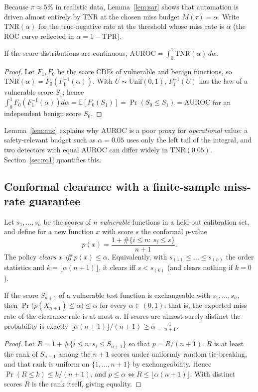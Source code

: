 Because $\pi\approx 5\%$ in realistic data, Lemma~\ref{lem:sar} shows that automation is driven almost entirely by $\mathrm{TNR}$ at the chosen miss budget $M(\tau)=\alpha$.
Write $\mathrm{TNR}(\alpha)$ for the true-negative rate at the threshold whose miss rate is $\alpha$ (the ROC curve reflected in $\alpha=1-\mathrm{TPR}$).

\begin{lemma}\label{lem:auc}
If the score distributions are continuous, $\mathrm{AUROC}=\int_0^1 \mathrm{TNR}(\alpha)\,d\alpha$.
\end{lemma}
\begin{proof}
Let $F_1,F_0$ be the score CDFs of vulnerable and benign functions, so $\mathrm{TNR}(\alpha)=F_0(F_1^{-1}(\alpha))$.
With $U\sim\mathrm{Unif}(0,1)$, $F_1^{-1}(U)$ has the law of a vulnerable score $S_1$; hence $\int_0^1F_0(F_1^{-1}(\alpha))d\alpha=\mathbb E[F_0(S_1)]=\Pr(S_0\le S_1)=\mathrm{AUROC}$ for an independent benign score $S_0$.
\end{proof}

Lemma~\ref{lem:auc} explains why AUROC is a poor proxy for \emph{operational} value: a safety-relevant budget such as $\alpha=0.05$ uses only the left tail of the integral, and two detectors with equal AUROC can differ widely in $\mathrm{TNR}(0.05)$.
Section~\ref{sec:rq1} quantifies this.

\subsection{Conformal clearance with a finite-sample miss-rate guarantee}
Let $s_1,\dots,s_n$ be the scores of $n$ \emph{vulnerable} functions in a held-out calibration set, and define for a new function $x$ with score $s$ the conformal $p$-value
\begin{equation}
  p(x)=\frac{1+\#\{i\le n:\ s_i\le s\}}{n+1}.\label{eq:pval}
\end{equation}
The policy \emph{clears $x$ iff $p(x)\le\alpha$}. Equivalently, with $s_{(1)}\le\dots\le s_{(n)}$ the order statistics and $k=\lfloor\alpha(n+1)\rfloor$, it clears iff $s<s_{(k)}$ (and clears nothing if $k=0$).

\begin{proposition}\label{prop:valid}
If the score $S_{n+1}$ of a vulnerable test function is exchangeable with $s_1,\dots,s_n$, then $\Pr\bigl(p(X_{n+1})\le\alpha\bigr)\le\alpha$ for every $\alpha\in(0,1)$; that is, the expected miss rate of the clearance rule is at most $\alpha$.
If scores are almost surely distinct the probability is exactly $\lfloor\alpha(n+1)\rfloor/(n+1)\ge\alpha-\tfrac1{n+1}$.
\end{proposition}
\begin{proof}
Let $R=1+\#\{i\le n: s_i\le S_{n+1}\}$ so that $p=R/(n+1)$. $R$ is at least the rank of $S_{n+1}$ among the $n{+}1$ scores under uniformly random tie-breaking, and that rank is uniform on $\{1,\dots,n{+}1\}$ by exchangeability. Hence $\Pr(R\le k)\le k/(n+1)$, and $p\le\alpha\iff R\le\lfloor\alpha(n+1)\rfloor$. With distinct scores $R$ is the rank itself, giving equality.
\end{proof}

